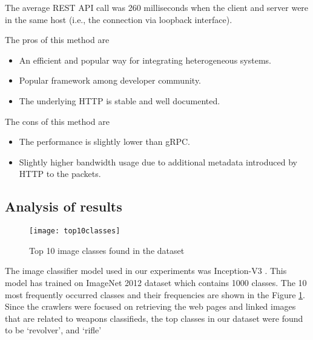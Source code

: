 The average REST API call was 260 milliseconds when the client and server were in the same host (i.e., the connection via loopback interface).

The pros of this method are
\begin{itemize}
	\item An efficient and popular way for integrating heterogeneous systems.
	\item Popular framework among developer community.
	\item The underlying HTTP is stable and well documented.
\end{itemize}

The cons of this method are
\begin{itemize}
	\item The performance is slightly lower than gRPC.
	\item Slightly higher bandwidth usage due to additional metadata introduced by HTTP to the packets.
\end{itemize}
\fi  %

\subsection{Analysis of results}
\begin{figure}[h]
	\texttt{[image: top10classes]}
	\caption{Top 10 image classes found in the dataset}
	\label{fig:top10ImgClass}
\end{figure}
The image classifier model used in our experiments was Inception-V3 \cite{SzegedyVISW15}. This model has trained on ImageNet 2012 dataset which contains 1000 classes\cite{ILSVRC15}.
The 10 most frequently occurred classes and their frequencies are shown in the Figure \ref{fig:top10ImgClass}. Since the crawlers were focused on retrieving the web pages and linked images that are related to weapons classifieds, the top classes in our dataset were found to be `revolver', and `rifle'

